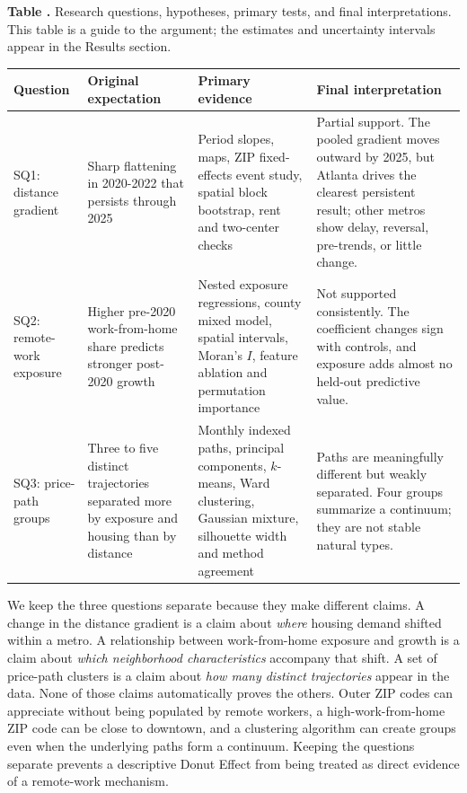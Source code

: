 \documentclass[11pt]{article}
\newcounter{tabnum}
\begin{document}
\begin{table}[H]\centering
{}\label{tab:rqsummary}
{\small\raggedright\textbf{Table \thetabnum.} Research questions, hypotheses, primary tests, and final interpretations. This table
is a guide to the argument; the estimates and uncertainty intervals appear in the Results section.\par}\vspace{4pt}
{\small\setlength{\tabcolsep}{3pt}\renewcommand{\arraystretch}{1.18}
\begin{tabular}{@{}p{.14\linewidth}p{.22\linewidth}p{.25\linewidth}p{.32\linewidth}@{}}
\toprule
Question & Original expectation & Primary evidence & Final interpretation \\
\midrule
SQ1: distance gradient & Sharp flattening in 2020-2022 that persists through 2025 & Period slopes, maps, ZIP fixed-effects event
study, spatial block bootstrap, rent and two-center checks & Partial support. The pooled gradient moves outward by 2025, but
Atlanta drives the clearest persistent result; other metros show delay, reversal, pre-trends, or little change. \\
SQ2: remote-work exposure & Higher pre-2020 work-from-home share predicts stronger post-2020 growth & Nested exposure
regressions, county mixed model, spatial intervals, Moran's $I$, feature ablation and permutation importance & Not supported
consistently. The coefficient changes sign with controls, and exposure adds almost no held-out predictive value. \\
SQ3: price-path groups & Three to five distinct trajectories separated more by exposure and housing than by distance & Monthly
indexed paths, principal components, $k$-means, Ward clustering, Gaussian mixture, silhouette width and method agreement & Paths
are meaningfully different but weakly separated. Four groups summarize a continuum; they are not stable natural types. \\
\bottomrule
\end{tabular}}
\end{table}

We keep the three questions separate because they make different claims. A change in the distance gradient is a claim about
\emph{where} housing demand shifted within a metro. A relationship between work-from-home exposure and growth is a claim about
\emph{which neighborhood characteristics} accompany that shift. A set of price-path clusters is a claim about \emph{how many
distinct trajectories} appear in the data. None of those claims automatically proves the others. Outer ZIP codes can appreciate
without being populated by remote workers, a high-work-from-home ZIP code can be close to downtown, and a clustering algorithm can
create groups even when the underlying paths form a continuum. Keeping the questions separate prevents a descriptive Donut Effect
from being treated as direct evidence of a remote-work mechanism.
\end{document}

